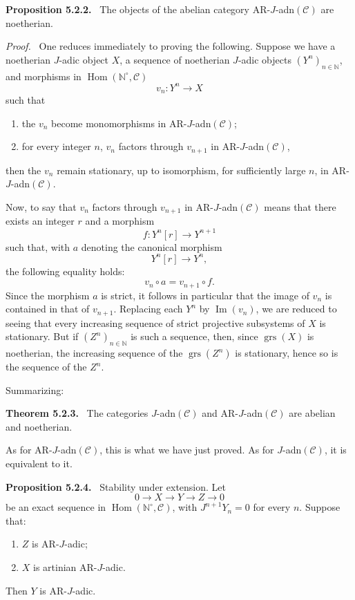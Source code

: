\documentclass[11pt]{article}
\newenvironment{statement}[1]{\par\medskip\noindent\textbf{#1.}\ }{\par\medskip}
\newenvironment{prooftext}[1][Proof]{\par\noindent\emph{#1.}\ }{\par\medskip}
\DeclareMathOperator{\Hom}{Hom}
\providecommand{\Hom}{\operatorname{Hom}}
\providecommand{\Im}{\operatorname{Im}}
\renewcommand{\Im}{\operatorname{Im}}
\providecommand{\grs}{\operatorname{grs}}
\providecommand{\Im}{\operatorname{Im}}
\providecommand{\Hom}{\operatorname{Hom}}
\begin{document}
\begin{statement}{Proposition 5.2.2}
The objects of the abelian category AR-\(J\)-adn\((\mathcal C)\) are noetherian.
\end{statement}

\begin{prooftext}
One reduces immediately to proving the following. Suppose we have a noetherian \(J\)-adic object \(X\), a sequence of noetherian \(J\)-adic objects \((Y^n)_{n\in\mathbb N}\), and morphisms in \(\Hom(\mathbb N^\circ,\mathcal C)\)
\[
v_n:Y^n\longrightarrow X
\]
such that
\begin{enumerate}[label=\textup{(\roman*)}]
\item the \(v_n\) become monomorphisms in AR-\(J\)-adn\((\mathcal C)\);
\item for every integer \(n\), \(v_n\) factors through \(v_{n+1}\) in AR-\(J\)-adn\((\mathcal C)\),
\end{enumerate}
then the \(v_n\) remain stationary, up to isomorphism, for sufficiently large \(n\), in AR-\(J\)-adn\((\mathcal C)\).

Now, to say that \(v_n\) factors through \(v_{n+1}\) in AR-\(J\)-adn\((\mathcal C)\) means that there exists an integer \(r\) and a morphism
\[
f:Y^n[r]\longrightarrow Y^{n+1}
\]
such that, with \(a\) denoting the canonical morphism
\[
Y^n[r]\longrightarrow Y^n,
\]
the following equality holds:
\[
v_n\circ a=v_{n+1}\circ f .
\]
Since the morphism \(a\) is strict, it follows in particular that the image of \(v_n\) is contained in that of \(v_{n+1}\). Replacing each \(Y^n\) by \(\Im(v_n)\), we are reduced to seeing that every increasing sequence of strict projective subsystems of \(X\) is stationary. But if \((Z^n)_{n\in\mathbb N}\) is such a sequence, then, since \(\grs(X)\) is noetherian, the increasing sequence of the \(\grs(Z^n)\) is stationary, hence so is the sequence of the \(Z^n\).
\end{prooftext}

Summarizing:

\begin{statement}{Theorem 5.2.3}
The categories \(J\)-adn\((\mathcal C)\) and AR-\(J\)-adn\((\mathcal C)\) are abelian and noetherian.
\end{statement}

As for AR-\(J\)-adn\((\mathcal C)\), this is what we have just proved. As for \(J\)-adn\((\mathcal C)\), it is equivalent to it.

\begin{statement}{Proposition 5.2.4}
Stability under extension. Let
\[
0\longrightarrow X\longrightarrow Y\longrightarrow Z\longrightarrow0
\]
be an exact sequence in \(\Hom(\mathbb N^\circ,\mathcal C)\), with \(J^{n+1}Y_n=0\) for every \(n\). Suppose that:
\begin{enumerate}[label=\textup{(\roman*)}]
\item \(Z\) is AR-\(J\)-adic;
\item \(X\) is artinian AR-\(J\)-adic.
\end{enumerate}
Then \(Y\) is AR-\(J\)-adic.
\end{statement}
\end{document}
